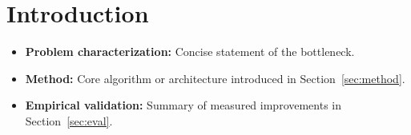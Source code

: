 \section{Introduction}
\label{sec:intro}


\begin{itemize}
  \item \textbf{Problem characterization:} Concise statement of the bottleneck.
  \item \textbf{Method:} Core algorithm or architecture introduced in Section~\ref{sec:method}.
  \item \textbf{Empirical validation:} Summary of measured improvements in Section~\ref{sec:eval}.
\end{itemize}

